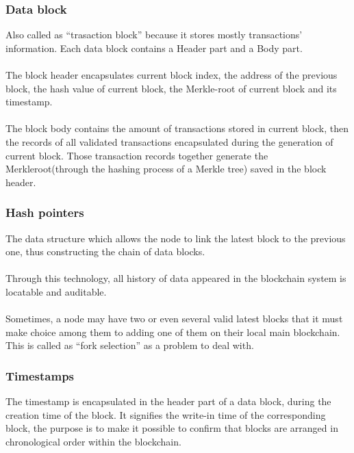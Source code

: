 \documentclass[doublespacing]{bmcart}
\begin{document}
\begin{CJK*}{UTF8}{gbsn}
\subsubsection*{Data block}
Also called as ``trasaction block'' because it stores mostly transactions' information. Each data block contains a Header part and a Body part.
\paragraph{} 
The block header encapsulates current block index, the address of the previous block, the hash value of current block, the Merkle-root of current block and its timestamp.
\paragraph{} 
The block body contains the amount of transactions stored in current block, then the records of all validated transactions encapsulated during the generation of current block. Those transaction records together generate the Merkleroot(through the hashing process of a Merkle tree) saved in the block header. 
\subsubsection*{Hash pointers}
The data structure which allows the node to link the latest block to the previous one, thus constructing the chain of data blocks.
\paragraph{} 
Through this technology, all history of data appeared in the blockchain system is locatable and auditable.
\paragraph{} 
Sometimes, a node may have two or even several valid latest blocks that it must make choice among them to adding one of them on their local main blockchain. This is called as ``fork selection'' as a problem to deal with.
\subsubsection*{Timestamps}
The timestamp is encapsulated in the header part of a data block, during the creation time of the block. It signifies the write-in time of the corresponding block, the purpose is to make it possible to confirm that blocks are arranged in chronological order within the blockchain.

\end{CJK*}
\end{document}
